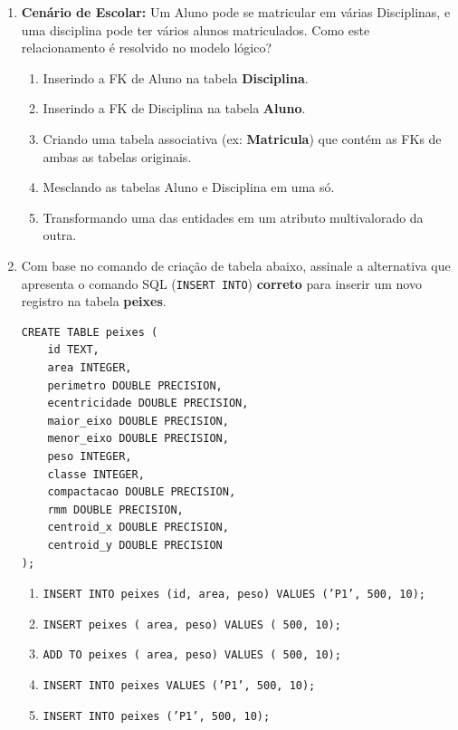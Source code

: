 \documentclass[12pt,a4paper]{article}
\begin{document}
\begin{enumerate}
    \item \textbf{Cenário de Escolar:} Um Aluno pode se matricular em várias Disciplinas, e uma disciplina pode ter vários alunos matriculados. Como este relacionamento é resolvido no modelo lógico?
    \begin{enumerate}[label=\Alph*)]
        \item Inserindo a FK de Aluno na tabela \textbf{Disciplina}.
        \item Inserindo a FK de Disciplina na tabela \textbf{Aluno}.
        \item Criando uma tabela associativa (ex: \textbf{Matricula}) que contém as FKs de ambas as tabelas originais.
        \item Mesclando as tabelas Aluno e Disciplina em uma só.
        \item Transformando uma das entidades em um atributo multivalorado da outra.
    \end{enumerate}

 \item Com base no comando de criação de tabela abaixo, assinale a alternativa que apresenta o comando SQL (\texttt{INSERT INTO}) \textbf{correto} para inserir um novo registro na tabela \textbf{peixes}.

\begin{verbatim}
CREATE TABLE peixes (
    id TEXT,
    area INTEGER,
    perimetro DOUBLE PRECISION,
    ecentricidade DOUBLE PRECISION,
    maior_eixo DOUBLE PRECISION,
    menor_eixo DOUBLE PRECISION,
    peso INTEGER,
    classe INTEGER,
    compactacao DOUBLE PRECISION,
    rmm DOUBLE PRECISION,
    centroid_x DOUBLE PRECISION,
    centroid_y DOUBLE PRECISION
);
\end{verbatim}

\begin{enumerate}[label=\Alph*)]
    \item \texttt{INSERT INTO peixes (id, area, peso) VALUES ('P1', 500, 10);}
    \item \texttt{INSERT peixes ( area, peso) VALUES ( 500, 10);}
    \item \texttt{ADD TO peixes ( area, peso) VALUES ( 500, 10);}
    \item \texttt{INSERT INTO peixes VALUES ('P1', 500, 10);}
    \item \texttt{INSERT INTO peixes ('P1', 500, 10);}
\end{enumerate}



\vspace{0.8cm}


\end{enumerate}
\end{document}
